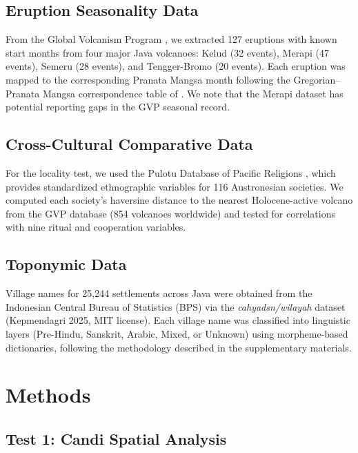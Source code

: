 \documentclass[12pt,a4paper]{article}
\begin{document}
\subsection{Eruption Seasonality Data}

From the Global Volcanism Program \citep{gvp2023}, we extracted 127 eruptions with known start months from four major Java volcanoes: Kelud (32 events), Merapi (47 events), Semeru (28 events), and Tengger-Bromo (20 events). Each eruption was mapped to the corresponding Pranata Mangsa month following the Gregorian--Pranata Mangsa correspondence table of \citet{daldjoeni1984}. We note that the Merapi dataset has potential reporting gaps in the GVP seasonal record.

\subsection{Cross-Cultural Comparative Data}

For the locality test, we used the Pulotu Database of Pacific Religions \citep{watts2015}, which provides standardized ethnographic variables for 116 Austronesian societies. We computed each society's haversine distance to the nearest Holocene-active volcano from the GVP database (854 volcanoes worldwide) and tested for correlations with nine ritual and cooperation variables.

\subsection{Toponymic Data}

Village names for 25,244 settlements across Java were obtained from the Indonesian Central Bureau of Statistics (BPS) via the \emph{cahyadsn/wilayah} dataset (Kepmendagri 2025, MIT license). Each village name was classified into linguistic layers (Pre-Hindu, Sanskrit, Arabic, Mixed, or Unknown) using morpheme-based dictionaries, following the methodology described in the supplementary materials.

\section{Methods}

\subsection{Test 1: Candi Spatial Analysis}
\label{sec:spatial}
\end{document}
